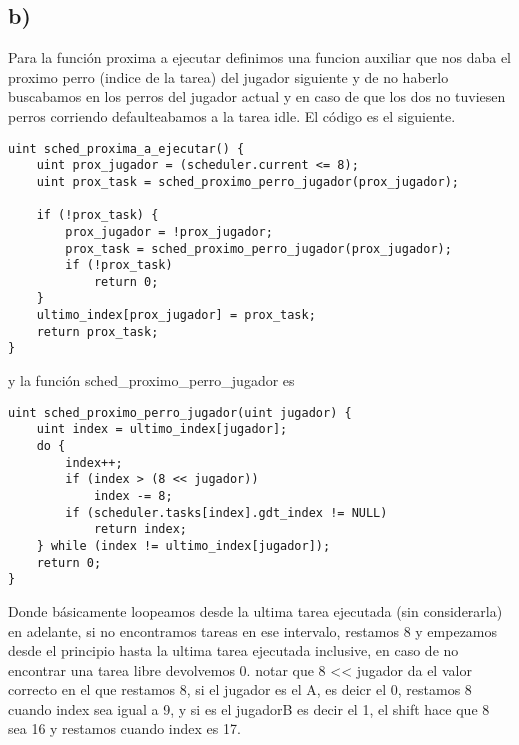 \subsection{b)}

Para la función proxima a ejecutar definimos una funcion auxiliar que nos daba el proximo perro (indice de la tarea) del jugador siguiente y de no haberlo buscabamos en los perros del jugador actual y en caso de que los dos no tuviesen perros corriendo defaulteabamos a la tarea idle. El código es el siguiente.

\begin{codesnippet}
\begin{verbatim}
uint sched_proxima_a_ejecutar() {
    uint prox_jugador = (scheduler.current <= 8);
    uint prox_task = sched_proximo_perro_jugador(prox_jugador);

    if (!prox_task) {
        prox_jugador = !prox_jugador;
        prox_task = sched_proximo_perro_jugador(prox_jugador);
        if (!prox_task)
            return 0;
    }
    ultimo_index[prox_jugador] = prox_task;
    return prox_task;
}
\end{verbatim}
\end{codesnippet}

y la función sched_proximo_perro_jugador es 

\begin{codesnippet}
\begin{verbatim}
uint sched_proximo_perro_jugador(uint jugador) {
    uint index = ultimo_index[jugador];
    do {
        index++;
        if (index > (8 << jugador))
            index -= 8;
        if (scheduler.tasks[index].gdt_index != NULL)
            return index;
    } while (index != ultimo_index[jugador]);
    return 0;
}
\end{verbatim}
\end{codesnippet}

Donde básicamente loopeamos desde la ultima tarea ejecutada (sin considerarla) en adelante, si no encontramos tareas en ese intervalo, restamos 8 y empezamos desde el principio hasta la ultima tarea ejecutada inclusive, en caso de no encontrar una tarea 
libre devolvemos 0. notar que 8 << jugador da el valor correcto en el que restamos 8, si el jugador es el A, es deicr el 0, restamos 8 cuando index sea igual a 9, y si es el jugadorB es decir el 1, el shift hace que 8 sea 16 y restamos cuando index es 17. 